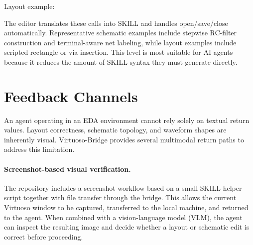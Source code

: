 \documentclass[lettersize,journal]{ieee_template/IEEEtran}
\begin{document}

Layout example:


The editor translates these calls into SKILL and handles open/save/close automatically. Representative schematic examples include stepwise RC-filter construction and terminal-aware net labeling, while layout examples include scripted rectangle or via insertion. This level is most suitable for AI agents because it reduces the amount of SKILL syntax they must generate directly.



\section{Feedback Channels}

An agent operating in an EDA environment cannot rely solely on textual return values. Layout correctness, schematic topology, and waveform shapes are inherently visual. Virtuoso-Bridge provides several multimodal return paths to address this limitation.

\paragraph{Screenshot-based visual verification.} The repository includes a screenshot workflow based on a small SKILL helper script together with file transfer through the bridge. This allows the current Virtuoso window to be captured, transferred to the local machine, and returned to the agent. When combined with a vision-language model (VLM), the agent can inspect the resulting image and decide whether a layout or schematic edit is correct before proceeding.
\end{document}
